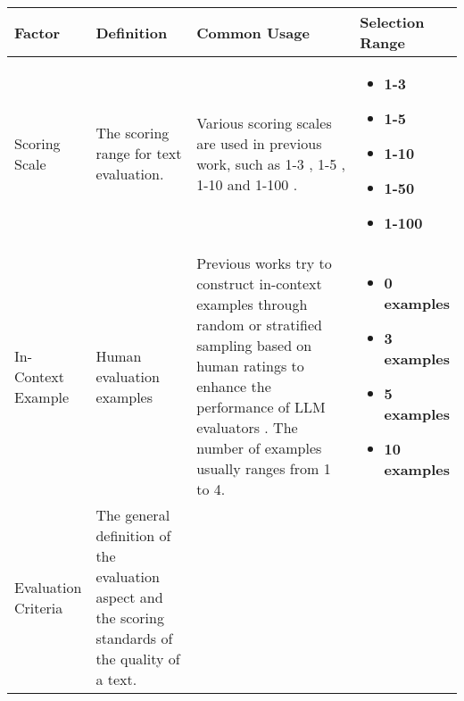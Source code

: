 \begin{table*} [t]
\small
\centering
\resizebox{0.95\linewidth}{!} {
\begin{tabular}{p{0.09\linewidth}p{0.24\linewidth}p{0.44\linewidth}p{0.23\linewidth}}
\toprule
\textbf{Factor} & \textbf{Definition} & \textbf{Common Usage}  & \textbf{Selection Range} \\
\midrule
Scoring \newline Scale & The scoring range for text evaluation. &
Various scoring scales are used in previous work, such as 1-3 \cite{gopalakrishnan2019topical, lin2023llm}, 1-5 \cite{fabbri-etal-2021-summeval, chhun-etal-2022-human}, 1-10 \cite{liu-etal-2024-alignbench} and 1-100 \cite{stureborg2024large}. & 
\begin{minipage}[t]{\linewidth}\vspace{-7pt}\begin{itemize}[noitemsep, topsep=0pt, left=0pt]
    \item \textbf{1-3}
    \item \textbf{1-5}
    \item \textbf{1-10}
    \item \textbf{1-50}
    \item \textbf{1-100}
\end{itemize}\vspace{1pt}\end{minipage} \\
\midrule
In-Context \newline Example & Human evaluation examples & 
Previous works try to construct in-context examples through random or stratified sampling based on human ratings to enhance the performance of LLM evaluators \cite{kim-etal-2023-better, huang2024empirical, jain-etal-2023-multi}. The number of examples usually ranges from 1 to 4. & \begin{minipage}[t]{\linewidth}\vspace{-7pt}\begin{itemize}[noitemsep, topsep=0pt, left=0pt]
    \item \textbf{0 examples}
    \item \textbf{3 examples}
    \item \textbf{5 examples}
    \item \textbf{10 examples}
\end{itemize}\vspace{-7pt}\end{minipage} \\
\midrule
Evaluation \newline Criteria & The general definition of the evaluation aspect and the scoring standards of the quality of a text. & 

\end{tabular}}
\end{table*}

